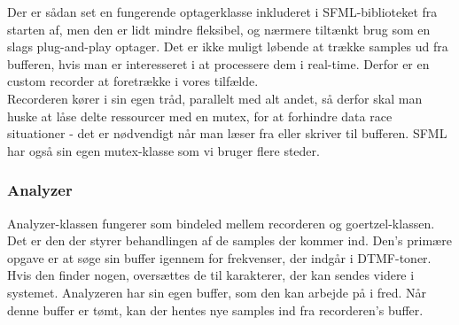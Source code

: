Der er sådan set en fungerende optagerklasse inkluderet i SFML-biblioteket fra starten af, men den er lidt mindre fleksibel, og nærmere tiltænkt brug som en slags plug-and-play optager. Det er ikke muligt løbende at trække samples ud fra bufferen, hvis man er interesseret i at processere dem i real-time. Derfor er en custom recorder at foretrække i vores tilfælde. \\
Recorderen kører i sin egen tråd, parallelt med alt andet, så derfor skal man huske at låse delte ressourcer med en mutex, for at forhindre data race situationer - det er nødvendigt når man læser fra eller skriver til bufferen. SFML har også sin egen mutex-klasse som vi bruger flere steder.

\subsubsection{Analyzer}

Analyzer-klassen fungerer som bindeled mellem recorderen og goertzel-klassen. Det er den der styrer behandlingen af de samples der kommer ind. Den's primære opgave er at søge sin buffer igennem for frekvenser, der indgår i DTMF-toner. Hvis den finder nogen, oversættes de til karakterer, der kan sendes videre i systemet. Analyzeren har sin egen buffer, som den kan arbejde på i fred. Når denne buffer er tømt, kan der hentes nye samples ind fra recorderen's buffer. \\

